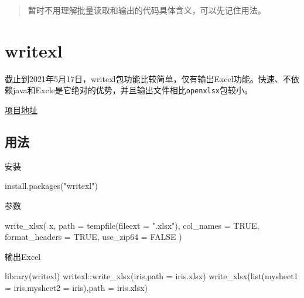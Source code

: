 \documentclass[
]{book}
\newenvironment{Shaded}{\begin{snugshade}}{\end{snugshade}}
\newcommand{\AttributeTok}[1]{\textcolor[rgb]{0.77,0.63,0.00}{#1}}
\newcommand{\ConstantTok}[1]{\textcolor[rgb]{0.00,0.00,0.00}{#1}}
\newcommand{\FunctionTok}[1]{\textcolor[rgb]{0.00,0.00,0.00}{#1}}
\newcommand{\NormalTok}[1]{#1}
\newcommand{\SpecialCharTok}[1]{\textcolor[rgb]{0.00,0.00,0.00}{#1}}
\newcommand{\StringTok}[1]{\textcolor[rgb]{0.31,0.60,0.02}{#1}}
\begin{document}
\begin{quote}
暂时不用理解批量读取和输出的代码具体含义，可以先记住用法。
\end{quote}

\hypertarget{writexl}{%
\section{writexl}\label{writexl}}

截止到2021年5月17日，writexl包功能比较简单，仅有输出Excel功能。快速、不依赖java和Excle是它绝对的优势，并且输出文件相比\texttt{openxlsx}包较小。

\href{https://docs.ropensci.org/writexl/}{项目地址}

\hypertarget{writexl:usage}{%
\subsection{用法}\label{writexl:usage}}

安装

\begin{Shaded}
\begin{Highlighting}[]
\FunctionTok{install.packages}\NormalTok{(}\StringTok{"writexl"}\NormalTok{)}
\end{Highlighting}
\end{Shaded}

参数

\begin{Shaded}
\begin{Highlighting}[]
\FunctionTok{write\_xlsx}\NormalTok{(}
\NormalTok{  x,}
  \AttributeTok{path =} \FunctionTok{tempfile}\NormalTok{(}\AttributeTok{fileext =} \StringTok{".xlsx"}\NormalTok{),}
  \AttributeTok{col\_names =} \ConstantTok{TRUE}\NormalTok{,}
  \AttributeTok{format\_headers =} \ConstantTok{TRUE}\NormalTok{,}
  \AttributeTok{use\_zip64 =} \ConstantTok{FALSE}
\NormalTok{)}
\end{Highlighting}
\end{Shaded}

输出Excel

\begin{Shaded}
\begin{Highlighting}[]
\FunctionTok{library}\NormalTok{(writexl)}
\NormalTok{writexl}\SpecialCharTok{::}\FunctionTok{write\_xlsx}\NormalTok{(iris,}\AttributeTok{path =} \StringTok{\textquotesingle{}iris.xlsx\textquotesingle{}}\NormalTok{)}
\FunctionTok{write\_xlsx}\NormalTok{(}\FunctionTok{list}\NormalTok{(}\AttributeTok{mysheet1 =}\NormalTok{ iris,}\AttributeTok{mysheet2 =}\NormalTok{ iris),}\AttributeTok{path =} \StringTok{\textquotesingle{}iris.xlsx\textquotesingle{}}\NormalTok{)}
\end{Highlighting}
\end{Shaded}
\end{document}
